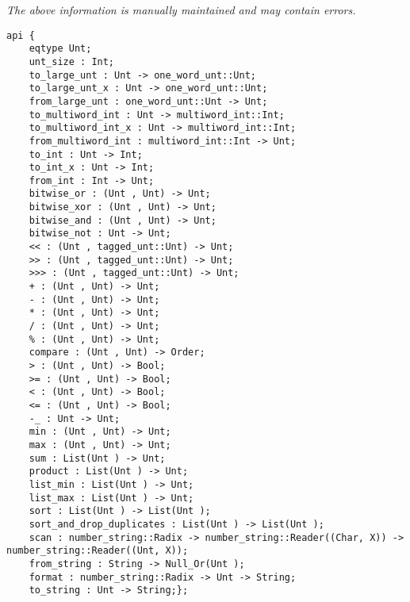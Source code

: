 \label{api:Unt}

{\tiny \it The above information is manually maintained and may contain errors.}
\begin{verbatim}
api {
    eqtype Unt;
    unt_size : Int;
    to_large_unt : Unt -> one_word_unt::Unt;
    to_large_unt_x : Unt -> one_word_unt::Unt;
    from_large_unt : one_word_unt::Unt -> Unt;
    to_multiword_int : Unt -> multiword_int::Int;
    to_multiword_int_x : Unt -> multiword_int::Int;
    from_multiword_int : multiword_int::Int -> Unt;
    to_int : Unt -> Int;
    to_int_x : Unt -> Int;
    from_int : Int -> Unt;
    bitwise_or : (Unt , Unt) -> Unt;
    bitwise_xor : (Unt , Unt) -> Unt;
    bitwise_and : (Unt , Unt) -> Unt;
    bitwise_not : Unt -> Unt;
    << : (Unt , tagged_unt::Unt) -> Unt;
    >> : (Unt , tagged_unt::Unt) -> Unt;
    >>> : (Unt , tagged_unt::Unt) -> Unt;
    + : (Unt , Unt) -> Unt;
    - : (Unt , Unt) -> Unt;
    * : (Unt , Unt) -> Unt;
    / : (Unt , Unt) -> Unt;
    % : (Unt , Unt) -> Unt;
    compare : (Unt , Unt) -> Order;
    > : (Unt , Unt) -> Bool;
    >= : (Unt , Unt) -> Bool;
    < : (Unt , Unt) -> Bool;
    <= : (Unt , Unt) -> Bool;
    -_ : Unt -> Unt;
    min : (Unt , Unt) -> Unt;
    max : (Unt , Unt) -> Unt;
    sum : List(Unt ) -> Unt;
    product : List(Unt ) -> Unt;
    list_min : List(Unt ) -> Unt;
    list_max : List(Unt ) -> Unt;
    sort : List(Unt ) -> List(Unt );
    sort_and_drop_duplicates : List(Unt ) -> List(Unt );
    scan : number_string::Radix -> number_string::Reader((Char, X)) -> number_string::Reader((Unt, X));
    from_string : String -> Null_Or(Unt );
    format : number_string::Radix -> Unt -> String;
    to_string : Unt -> String;};
\end{verbatim}
\index[fun]{-\_}
\index[fun]{<=}
\index[fun]{<}
\index[fun]{>=}
\index[fun]{>}
\index[fun]{\%}
\index[fun]{/}
\index[fun]{*}
\index[fun]{-}
\index[fun]{+}
\index[fun]{>>>}
\index[fun]{>>}
\index[fun]{<<}
